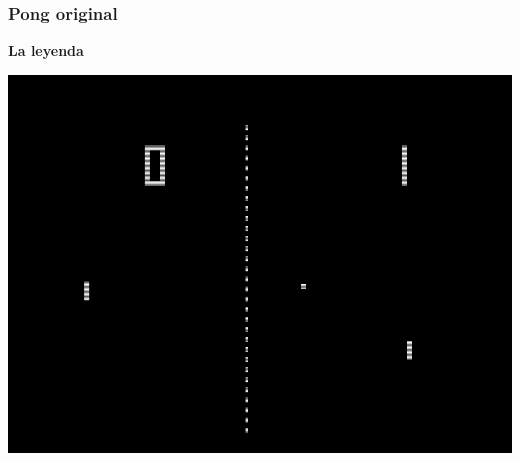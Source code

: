 \begin{frame}
	\frametitle{Pong original}
	
    \begin{center}
        \textbf{La leyenda}
    \end{center}
	
    \begin{center}
		\includegraphics[scale=0.4]{img/pong-original.png}
	\end{center}	

\end{frame}

